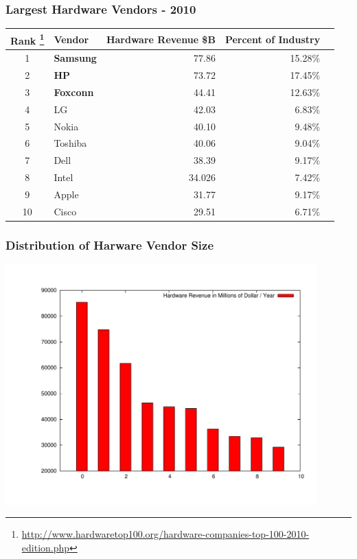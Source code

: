 \documentclass[18pt]{beamer}
\begin{document}
{
\begin{frame}
\frametitle{Largest Hardware Vendors - 2010}

\begin{center}
\begin{tabular}{clrrr}
\hline
  \textbf{Rank
\footnote{
\url{http://www.hardwaretop100.org/hardware-companies-top-100-2010-edition.php}}
} &\textbf{Vendor} & \textbf{Hardware Revenue \$B} & \textbf{Percent of Industry} \\
\hline
\hline
1 &  \textbf{Samsung} & 77.86 & 15.28\% \\
2 &  \textbf{HP} & 73.72 &  17.45\% \\
3 &  \textbf{Foxconn} & 44.41 &  12.63\% \\
4 &  LG & 42.03 & 6.83\% \\
5 &  Nokia & 40.10 & 9.48\% \\
6 &  Toshiba & 40.06 &  9.04\% \\
7 &  Dell & 38.39 & 9.17\% \\
8 &  Intel & 34.026 &  7.42\% \\
9 &  Apple & 31.77 & 9.17\% \\
10 &  Cisco & 29.51 &  6.71\% \\
\end{tabular}

\end{center}
\end{frame}
}
\begin{frame}
\frametitle{Distribution of Harware Vendor Size}
  \includegraphics[width=0.9\textwidth,height=0.9\paperheight]{../Art/LargestHardwareVendorsPlot.pdf}
\end{frame}
\end{document}
